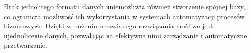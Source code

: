 Brak jednolitego formatu danych uniemożliwia również stworzenie spójnej bazy, co ogranicza możliwość ich wykorzystania w systemach automatyzacji procesów biznesowych. Dzięki wdrożeniu omawianego rozwiązania możliwe jest ujednolicenie danych, pozwalając na efektywne nimi zarządzanie i automatyczne przetwarzanie.
